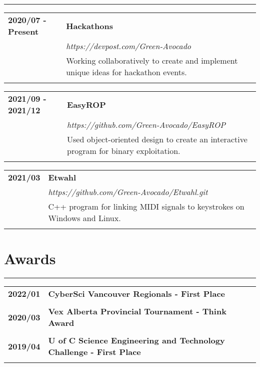\documentclass[letterpaper]{article}
\newcommand{\horizontalLine}{%
    {\color{cyan}
    \rule{\textwidth}{1pt}
    \vspace{-1ex}}
}
\begin{document}
        \horizontalLine

        \begin{tabular}{p{} p{}} 
            \textbf{2020/07 - Present} & \large\textbf{Hackathons} \\
            & \emph{https://devpost.com/Green-Avocado} \\
            & Working collaboratively to create and implement unique ideas for hackathon events. \\
            \\
        \end{tabular}

        \begin{tabular}{p{} p{}} 
            \textbf{2021/09 - 2021/12} & \large\textbf{EasyROP} \\
            & \emph{https://github.com/Green-Avocado/EasyROP} \\
            & Used object-oriented design to create an interactive program for binary exploitation. \\
            \\
        \end{tabular}

        \begin{tabular}{p{} p{}} 
            \textbf{2021/03} & \large\textbf{Etwahl} \\
            & \emph{https://github.com/Green-Avocado/Etwahl.git} \\
            & C++ program for linking MIDI signals to keystrokes on Windows and Linux. \\
            \\
        \end{tabular}

    \section*{Awards}

        \horizontalLine

        \begin{tabular}{p{} p{}} 
            \textbf{2022/01} & \large\textbf{CyberSci Vancouver Regionals - First Place} \\
            \\
            \textbf{2020/03} & \large\textbf{Vex Alberta Provincial Tournament - Think Award} \\
            \\
            \textbf{2019/04} & \large\textbf{U of C Science Engineering and Technology Challenge - First Place} \\
            \\
        \end{tabular}
\end{document}
